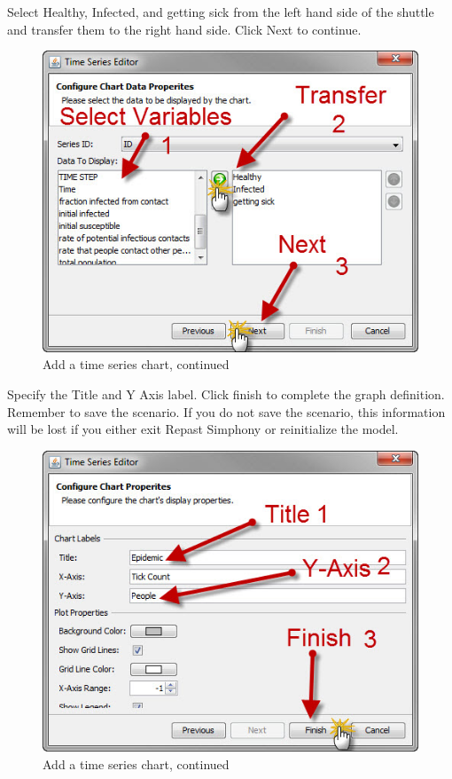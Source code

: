 \documentclass[11pt]{amsart}
\begin{document}
Select Healthy, Infected, and getting sick from the left hand side of the shuttle and transfer them to the right hand side. Click Next to continue.


\begin{figure}[ht]
\begin{center}
\vspace{.2in}
\centerline {
\includegraphics[totalheight=0.3\textheight]{images/038.jpg}
}
\caption{Add a time series chart, continued}
\label{fig:038}
\end{center}
\end{figure}


Specify the Title and Y Axis label. Click finish to complete the graph definition. Remember to save the scenario. If you do not save the scenario, this information will be lost if you either exit Repast Simphony or reinitialize the model.

\begin{figure}[ht]
\begin{center}
\vspace{.2in}
\centerline {
\includegraphics[totalheight=0.3\textheight]{images/039.jpg}
}
\caption{Add a time series chart, continued}
\label{fig:039}
\end{center}
\end{figure}
\end{document}
